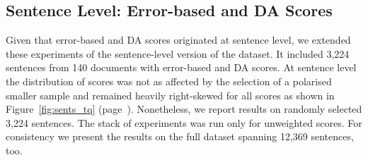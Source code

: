 \subsection{\label{ssec:sent_level}Sentence Level: Error-based and DA Scores}
Given that error-based and DA scores originated at sentence level, we extended these experiments of the sentence-level version of the dataset. It included 3,224 sentences from 140 documents with error-based and DA scores. At sentence level the distribution of scores was not as affected by the selection of a polarised smaller sample and remained heavily right-skewed for all scores as shown in Figure~\ref{fig:sents_tq} (page~\pageref{fig:sents_tq}). Nonetheless, we report results on randomly selected 3,224 sentences. The stack of experiments was run only for unweighted scores. For consistency we present the results on the full dataset spanning 12,369 sentences, too.
